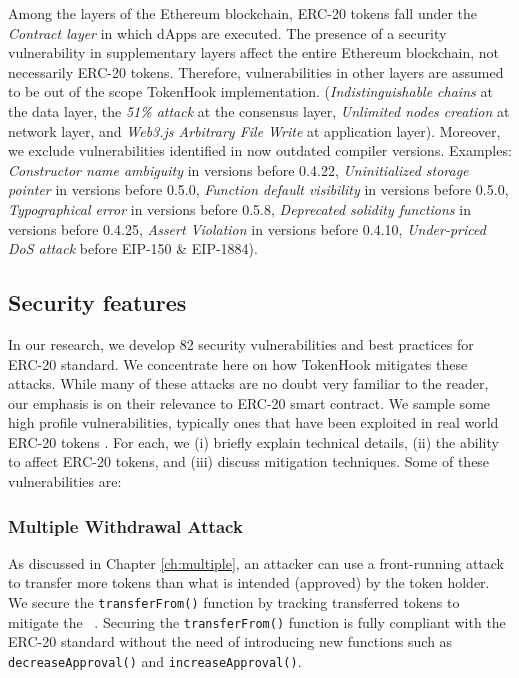 Among the layers of the Ethereum blockchain, ERC-20 tokens fall under the \textit{Contract layer} in which dApps are executed. The presence of a security vulnerability in supplementary layers affect the entire Ethereum blockchain, not necessarily ERC-20 tokens. Therefore, vulnerabilities in other layers are assumed to be out of the scope TokenHook implementation. (\eg \textit{Indistinguishable chains} at the data layer, the \textit{51\% attack} at the consensus layer, \textit{Unlimited nodes creation} at network layer, and \textit{Web3.js Arbitrary File Write} at application layer). Moreover, we exclude vulnerabilities identified in now outdated compiler versions. Examples: \textit{Constructor name ambiguity} in versions before 0.4.22, \textit{Uninitialized storage pointer} in versions before 0.5.0, \textit{Function default visibility} in versions before 0.5.0, \textit{Typographical error} in versions before 0.5.8, \textit{Deprecated solidity functions} in versions before 0.4.25, \textit{Assert Violation} in versions before 0.4.10, \textit{Under-priced DoS attack} before EIP-150 \& EIP-1884).

\subsection{Security features}
In our research, we develop 82 security vulnerabilities and best practices for ERC-20 standard. We concentrate here on how TokenHook mitigates these attacks. While many of these attacks are no doubt very familiar to the reader, our emphasis is on their relevance to ERC-20 smart contract. We sample some high profile vulnerabilities, typically ones that have been exploited in real world ERC-20 tokens \cite{SolidtySecBlog,EthSecServ,SoliditySecCon,ConsensysSecCon,LandoKL}. For each, we (i) briefly explain technical details, (ii) the ability to affect ERC-20 tokens, and (iii) discuss mitigation techniques. Some of these vulnerabilities are:

\subsubsection{Multiple Withdrawal Attack} As discussed in Chapter \ref{ch:multiple}, an attacker can use a front-running attack~\cite{OrderingAttack,eskandari2019sok} to transfer more tokens than what is intended (approved) by the token holder. We secure the \texttt{transferFrom()} function by tracking transferred tokens to mitigate the \mwa~\cite{MultipleWithdrawal}. Securing the \texttt{transferFrom()} function is fully compliant with the ERC-20 standard without the need of introducing new functions such as \texttt{decreaseApproval()} and \texttt{increaseApproval()}. 

